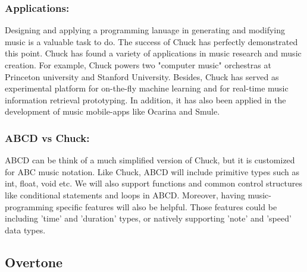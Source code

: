     \subsubsection{Applications:}
    Designing and applying a programming lanuage in generating and modifying music is a valuable task to do. The success of Chuck has perfectly demonstrated this point. Chuck has found a variety of applications in music research and music creation. For example, Chuck powers two "computer music" orchestras at Princeton university and Stanford University. Besides, Chuck has served as experimental platform for on-the-fly machine learning and for real-time music information retrieval prototyping\cite{Wang15}. In addition, it has also been applied in the development of music mobile-apps like Ocarina and Smule\cite{Wang15}. 

    \subsubsection{ABCD vs Chuck:}
    ABCD can be think of a much simplified version of Chuck, but it is customized for ABC music notation. Like Chuck, ABCD will include primitive types such as int, float, void etc. We will also support functions and common control structures like conditional statements and loops in ABCD. Moreover, having music-programming specific features will also be helpful. Those features could be including 'time' and 'duration' types, or natively supporting 'note' and 'speed' data types.
     

\subsection{Overtone}

